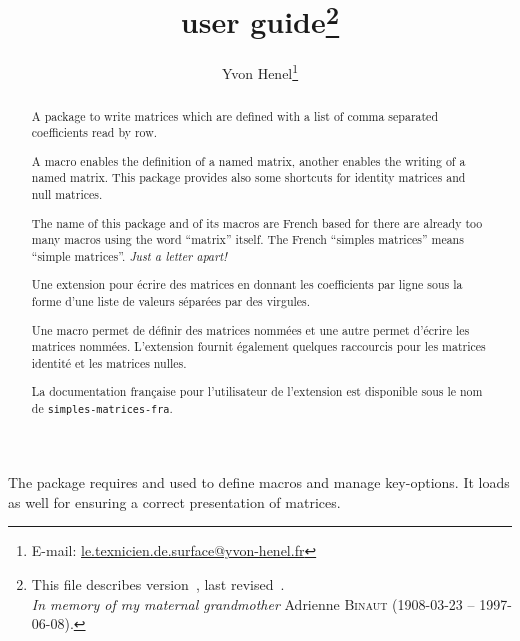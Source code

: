 \documentclass[full]{l3doc}
\begin{document}
\title{ user guide\thanks{This file describes
    version~\ExplFileVersion, last revised~\ExplFileDate.\\
    \emph{In memory of my maternal grandmother} Adrienne \textsc{Binaut}
    (1908-03-23 -- 1997-06-08).}  }
\author{Yvon Henel\thanks{E-mail:
    \href{mailto:le.texnicien.de.surface@yvon-henel.fr}
    {le.texnicien.de.surface@yvon-henel.fr}}}
\maketitle
\noindent\hrulefill

\begin{abstract}
A package to write matrices which are defined with a list of comma separated
coefficients read by row.

A macro enables the definition of a named matrix, another enables the writing of
a named matrix. This package provides also some shortcuts for identity matrices
and null matrices.

The name of this package and of its macros are French based for there are
already too many macros using the word ``matrix'' itself. The French
``\foreignlanguage{french}{simples matrices}'' means ``simple
matrices''. \emph{Just a letter apart!}
\end{abstract}

\noindent\hrulefill

 \begin{otherlanguage}{french}
\begin{abstract}
Une extension pour écrire des matrices en donnant les coefficients par ligne
sous la forme d'une liste de valeurs séparées par des virgules.

Une macro permet de définir des matrices nommées et une autre permet d'écrire
les matrices nommées. L'extension fournit également quelques raccourcis pour les
matrices identité et les matrices nulles.

La documentation française pour l'utilisateur de l'extension
 est disponible sous le nom de \texttt{simples-matrices-fra}.
\end{abstract}
\end{otherlanguage}

\noindent\hrulefill

\tableofcontents{}

\vspace{3\baselineskip}

The package  requires  and  used
to define macros and manage key-options. It loads  as well for
ensuring a correct presentation of matrices.
\end{document}
